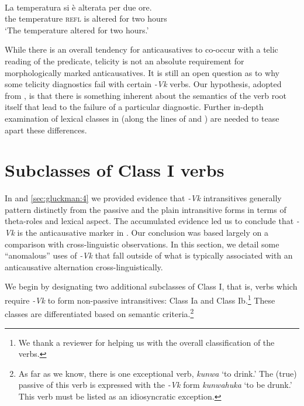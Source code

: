 \documentclass[output=paper]{langsci/lanmgscibook}
\begin{document}
\ea\label{ex:gluckman:} 
\\
\gll La temperatura  si     è   alterata per  due ore.\\
     the temperature \textsc{refl} is  altered  for   two hours\\
\glt ‘The temperature altered for two hours.’        
\z

While there is an overall tendency for anticausatives to co-occur with a telic reading of the predicate, telicity is not an absolute requirement for morphologically marked anticausatives. It is still an open question as to why some telicity diagnostics fail with certain  \textit{-Vk} verbs. Our hypothesis, adopted from \citet{Schäfer2008}, is that there is something inherent about the semantics of the verb root itself that lead to the failure of a particular diagnostic. Further in-depth examination of lexical classes in  (along the lines of \citet{Levin1995} and \citet{Haspelmath1993}) are needed to tease apart these differences. 

\section{Subclasses of Class I verbs}\label{sec:gluckman:5} %

In  and \ref{sec:gluckman:4} we provided evidence that  \textit{-Vk} intransitives generally pattern distinctly from the passive and the plain intransitive forms in terms of theta-roles and lexical aspect. The accumulated evidence led us to conclude that \textit{-Vk} is the anticausative marker in . Our conclusion was based largely on a comparison with cross-linguistic observations. In this section, we detail some “anomalous” uses of \textit{-Vk} that fall outside of what is typically associated with an anticausative alternation cross-linguistically.

We begin by designating two additional subclasses of Class I, that is, verbs which require \textit{-Vk} to form non-passive intransitives: Class Ia and Class Ib.\footnote{We thank a reviewer for helping us with the overall classification of the verbs.} These classes are differentiated based on semantic criteria.\footnote{As far as we know, there is one exceptional verb, \textit{kunwa} ‘to drink.’ The (true) passive of this verb is expressed with the \textit{-Vk} form \textit{kunwahuka} ‘to be drunk.’ This verb must be listed as an idiosyncratic exception.} 
\end{document}
